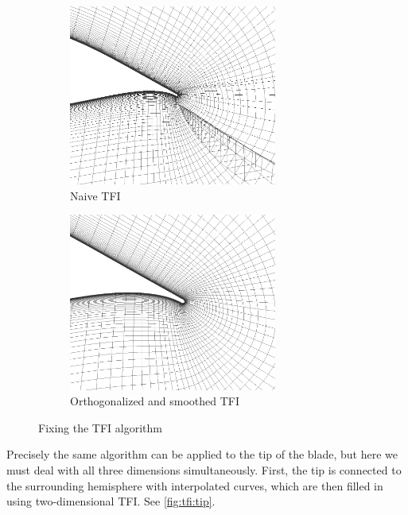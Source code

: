 \documentclass{nordic}
\begin{document}
\begin{figure}
  \centering
  \begin{subfigure}[b]{0.40\textwidth}
    \centering
    \includegraphics[width=0.75\textwidth]{figs/section12_zoom}
    \caption{Naive TFI}
    \label{fig:tfi:bad}
  \end{subfigure}
  \hspace{1cm}
  \begin{subfigure}[b]{0.40\textwidth}
    \centering
    \includegraphics[width=0.75\textwidth]{figs/section12_smooth_zoom}
    \caption{Orthogonalized and smoothed TFI}
    \label{fig:tfi:good}
  \end{subfigure}
  \caption{Fixing the TFI algorithm}
\end{figure}

Precisely the same algorithm can be applied to the tip of the blade, but here we must deal with all
three dimensions simultaneously.  First, the tip is connected to the surrounding hemisphere with
interpolated curves, which are then filled in using two-dimensional TFI.  See \autoref{fig:tfi:tip}.
\end{document}

